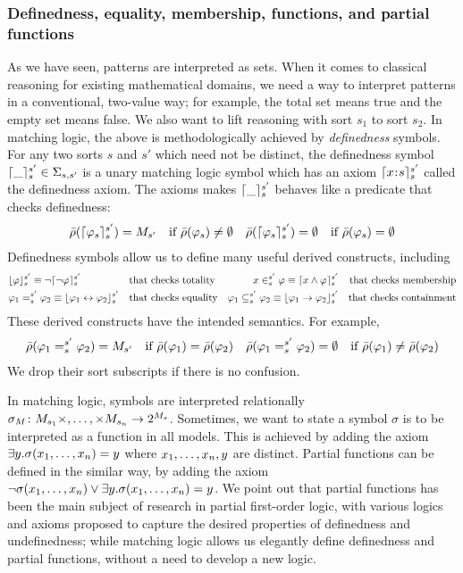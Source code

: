 \documentclass{amsart}
\begin{document}
\subsubsection{Definedness, equality, membership, functions, and partial 
functions}

As we have seen, patterns are interpreted as sets.
When it comes to classical reasoning for existing mathematical domains,
we need a way to interpret patterns in a conventional, two-value way;
for example, the total set means true and the empty set means false.
We also want to lift reasoning with sort $s_1$ to sort $s_2$.
In matching logic, the above is methodologically achieved by
\emph{definedness} symbols.
For any two sorts $s$ and $s'$ which need not be distinct, 
the definedness symbol
$\lceil\_\rceil_{s}^{s'} \in \Sigma_{s,s'}$
is a unary matching logic symbol which has an axiom
$
\lceil x \mathbin{\!:\!} s\rceil_{s}^{s'}
$
called the definedness axiom. 
The axioms makes $\lceil\_\rceil_{s}^{s'}$ behaves like a predicate
that checks definedness:
\begin{align*}
& \bar{\rho}(\lceil\varphi_s\rceil_{s}^{s'}) = M_{s'}
  \quad \text{if $\bar{\rho}(\varphi_s) \neq \emptyset$}
& \bar{\rho}(\lceil\varphi_s\rceil_{s}^{s'}) = \emptyset
  \quad \text{if $\bar{\rho}(\varphi_s) = \emptyset$}
\end{align*}
Definedness symbols allow us to define many useful derived constructs, including\begin{align*}
&\lfloor\varphi\rfloor_s^{s'} \equiv \neg \lceil\neg \varphi\rceil_s^{s'}
&& \text{that checks totality}
&x \in_s^{s'} \varphi \equiv \lceil x \wedge \varphi\rceil_s^{s'}
&& \text{that checks membership}
\\
&\varphi_1 =_s^{s'} \varphi_2 \equiv \lfloor\varphi_1 \leftrightarrow \varphi_2\rfloor_s^{s'}
&& \text{that checks equality}
&\varphi_1 \subseteq_s^{s'} \varphi_2 
\equiv \lfloor\varphi_1 \to \varphi_2\rfloor_s^{s'}
&& \text{that checks containment}
\end{align*}
These derived constructs have the intended semantics.
For example,
\begin{align*}
& \bar{\rho}(\varphi_1 =_{s}^{s'} \varphi_2) = M_{s'}
  \quad \text{if $\bar{\rho}(\varphi_1) = \bar{\rho}(\varphi_2)$}
& \bar{\rho}(\varphi_1 =_{s}^{s'} \varphi_2) = \emptyset
  \quad \text{if $\bar{\rho}(\varphi_1) \neq \bar{\rho}(\varphi_2)$}
\end{align*}
We drop their sort subscripts if there is no confusion.

In matching logic, symbols are interpreted relationally
$\sigma_M \colon M_{s_1} \times ,\dots, \times M_{s_n} \to 2^{M_s}$.
Sometimes, we want to state a symbol $\sigma$ is to be interpreted
as a function in all models.
This is achieved by adding the axiom
$\exists y . \sigma(x_1 ,\dots, x_n) = y$
where $x_1 ,\dots, x_n , y$ are distinct.
Partial functions can be defined in the similar way, by adding the axiom
$\neg \sigma(x_1 ,\dots, x_n) \vee \exists y . \sigma(x_1 ,\dots, x_n) = y$.
We point out that partial functions has been the main subject of research
in partial first-order logic, with various logics and axioms proposed
to capture the desired properties of definedness and undefinedness;
while matching logic allows us elegantly define definedness and partial 
functions, without a need to develop a new logic.
\end{document}
